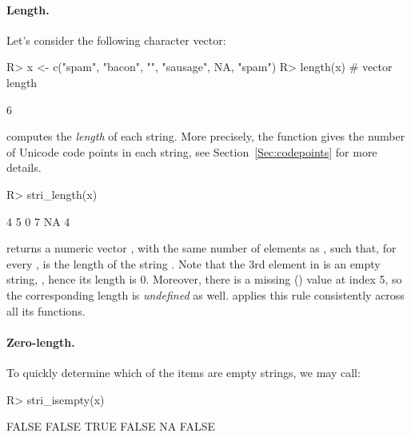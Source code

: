 \documentclass[nojss]{jss}
\newcommand{\strq}[1]{\code{{"{}#1"{}}}}
\begin{document}
\paragraph{Length.}
Let's consider the following character vector:

\begin{Schunk}
\begin{Sinput}
R> x <- c("spam", "bacon", "", "sausage", NA, "spam")
R> length(x)        # vector length
\end{Sinput}
\begin{Soutput}
[1] 6
\end{Soutput}
\end{Schunk}


 computes the \textit{length}
of each string.
More precisely,
the function gives the number of Unicode code points in each string,
see Section~\ref{Sec:codepoints} for more details.

\begin{Schunk}
\begin{Sinput}
R> stri_length(x)
\end{Sinput}
\begin{Soutput}
[1]  4  5  0  7 NA  4
\end{Soutput}
\end{Schunk}

\noindent
{} returns a numeric vector ,
with the same number of elements as , such that, for every ,
 is the length of the string .
Note that the 3rd element in  is an empty string, \strq{},
hence its length is  0.
Moreover, there is a missing () value
at index 5, so the corresponding length is \textit{undefined} as well.
 applies this rule consistently across all its functions.



\paragraph{Zero-length.}
To quickly determine which of the items are empty strings, we may call:

\begin{Schunk}
\begin{Sinput}
R> stri_isempty(x)
\end{Sinput}
\begin{Soutput}
[1] FALSE FALSE  TRUE FALSE    NA FALSE
\end{Soutput}
\end{Schunk}
\end{document}

